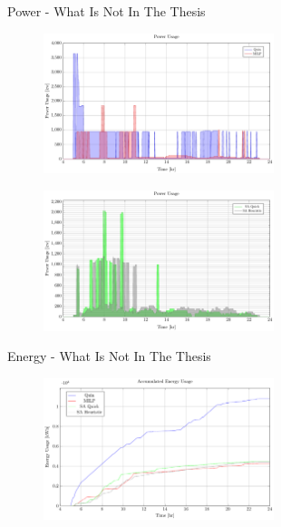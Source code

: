 \documentclass[bigger]{beamer}
\begin{document}
\begin{frame}[label={sec:org83250a6}]{Power - What Is Not In The Thesis}
\begin{figure}[htpb]
\centering
    \includegraphics[width=0.6\textwidth]{img/sa-pap-paper-good/power-milp-qin}
\end{figure}
\begin{figure}[htpb]
\centering
    \includegraphics[width=0.6\textwidth]{img/sa-pap-paper-good/power-sa}
\end{figure}
\end{frame}
\begin{frame}[label={sec:org89aacdb}]{Energy - What Is Not In The Thesis}
\begin{figure}[htpb]
\centering
    \includegraphics[width=0.6\textwidth]{img/sa-pap-paper-good/energy}
\end{figure}
\end{frame}
\end{document}
